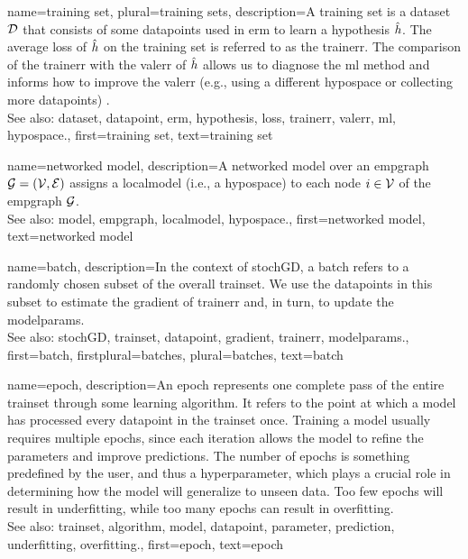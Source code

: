 {name={training set}, plural={training sets},
	description={A training set is a \gls{dataset} $\mathcal{D}$ that consists of some \glspl{datapoint} used in \gls{erm} 
		to learn a \gls{hypothesis} $\hat{h}$. The average \gls{loss} of $\hat{h}$ on the 
		training set is referred to as the \gls{trainerr}. The comparison of the \gls{trainerr} with the 
		\gls{valerr} of $\hat{h}$ allows us to diagnose the \gls{ml} method and informs how to improve 
		the \gls{valerr} (e.g., using a different \gls{hypospace} or collecting more \glspl{datapoint}) \cite[Sec. 6.6]{MLBasics}.
			\\
		See also: \gls{dataset}, \gls{datapoint}, \gls{erm}, \gls{hypothesis}, \gls{loss}, \gls{trainerr}, \gls{valerr}, \gls{ml}, \gls{hypospace}.},
	first={training set},
	text={training set}  
}

{name={networked model},
 	description={A networked \gls{model} over an \gls{empgraph} $\mathcal{G} = \left( \mathcal{V},\mathcal{E} \right)$ assigns 
   		a \gls{localmodel} (i.e., a \gls{hypospace}) to each node $i \in \mathcal{V}$ of the \gls{empgraph} $\mathcal{G}$.
   		\\
		See also: \gls{model}, \gls{empgraph}, \gls{localmodel}, \gls{hypospace}.}, 
   first={networked model},
   text={networked model}  
}

{name={batch},
	description={In the context of \gls{stochGD}, a batch refers to a randomly 
		chosen subset of the overall \gls{trainset}. We use the \glspl{datapoint} in this subset 
		to estimate the \gls{gradient} of \gls{trainerr} and, in turn, to update the \glspl{modelparam}.
			\\
		See also: \gls{stochGD}, \gls{trainset}, \gls{datapoint}, \gls{gradient}, \gls{trainerr}, \glspl{modelparam}.}, 
 	first={batch},
 	firstplural={batches}, 
 	plural={batches}, 
 	text={batch}  
}


{name={epoch},
	description={An epoch represents one complete pass of the entire \gls{trainset} through some learning 
		\gls{algorithm}. It refers to the point at which a \gls{model} has processed every \gls{datapoint} in the \gls{trainset} once. 
		Training a \gls{model} usually requires multiple epochs, since each iteration allows the \gls{model} to refine the 
		\glspl{parameter} and improve \glspl{prediction}. The number of epochs is something predefined by the user,  
		and thus a hyperparameter, which plays a crucial role in determining how the \gls{model} will generalize to unseen \gls{data}. 
		Too few epochs will result in \gls{underfitting}, while too many epochs can result in \gls{overfitting}.
		\\
		See also: \gls{trainset}, \gls{algorithm}, \gls{model}, \gls{datapoint}, \gls{parameter}, \gls{prediction}, \gls{underfitting}, \gls{overfitting}.},
	first={epoch},
	text={epoch}
} 


